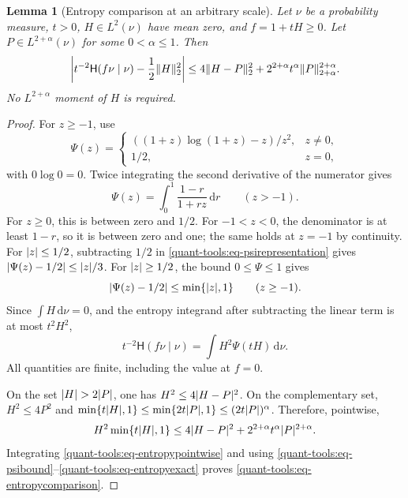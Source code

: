 \documentclass[11pt,reqno]{amsart}
\numberwithin{equation}{section}
\theoremstyle{plain}
\newtheorem{lemma}[lemma]{Lemma}
\theoremstyle{remark}
\DeclarePairedDelimiter{\abs}{\lvert}{\rvert}
\DeclarePairedDelimiter{\norm}{\lVert}{\rVert}
\newcommand{\md}{\mathrm{d}}
\newcommand{\Hr}{{\mathsf{H}}}
\begin{document}
\begin{lemma}[Entropy comparison at an arbitrary scale]\label{quant-tools:lem-entropy}
Let $\nu$ be a probability measure, $t>0$, $H\in L^2(\nu)$ have mean zero, and $f=1+tH\geq0$. Let $P\in L^{2+\alpha}(\nu)$ for some $0<\alpha\leq1$. Then
\begin{equation}\label{quant-tools:eq-entropycomparison}
 \left|t^{-2}\Hr(f\nu\mid\nu)-\frac12\norm H_2^2\right|
 \leq4\norm{H-P}_2^2+2^{2+\alpha}t^\alpha\norm P_{2+\alpha}^{2+\alpha}.
\end{equation}
No $L^{2+\alpha}$ moment of $H$ is required.
\end{lemma}
\begin{proof}
For $z\geq-1$, use
\begin{equation}\label{quant-tools:eq-psientropy}
 \Psi(z)=\begin{cases}((1+z)\log(1+z)-z)/z^2,&z\ne0,\\1/2,&z=0,\end{cases}
\end{equation}
with $0\log0=0$. Twice integrating the second derivative of the numerator gives
\begin{equation}\label{quant-tools:eq-psirepresentation}
 \Psi(z)=\int_0^1\frac{1-r}{1+rz}\,\md r\qquad(z>-1).
\end{equation}
For $z\geq0$, this is between zero and $1/2$. For $-1<z<0$, the denominator is at least $1-r$, so it is between zero and one; the same holds at $z=-1$ by continuity. For $\abs z\leq1/2$, subtracting $1/2$ in \eqref{quant-tools:eq-psirepresentation} gives
$\abs{\Psi(z)-1/2}\leq\abs z/3$. For $\abs z\geq1/2$, the bound $0\leq\Psi\leq1$ gives
\begin{equation}\label{quant-tools:eq-psibound}
 \abs{\Psi(z)-1/2}\leq\min\{\abs z,1\}\qquad(z\geq-1).
\end{equation}
Since $\int H\,\md\nu=0$, and the entropy integrand after subtracting the linear term is at most $t^2H^2$,
\begin{equation}\label{quant-tools:eq-entropyexact}
 t^{-2}\Hr(f\nu\mid\nu)=\int H^2\Psi(tH)\,\md\nu.
\end{equation}
All quantities are finite, including the value at $f=0$.

On the set $\abs H>2\abs P$, one has $H^2\leq4\abs{H-P}^2$. On the complementary set, $H^2\leq4P^2$ and
$\min\{t\abs H,1\}\leq\min\{2t\abs P,1\}\leq(2t\abs P)^\alpha$.
Therefore, pointwise,
\begin{equation}\label{quant-tools:eq-entropypointwise}
 H^2\min\{t\abs H,1\}
 \leq4\abs{H-P}^2+2^{2+\alpha}t^\alpha\abs P^{2+\alpha}.
\end{equation}
Integrating \eqref{quant-tools:eq-entropypointwise} and using \eqref{quant-tools:eq-psibound}--\eqref{quant-tools:eq-entropyexact} proves \eqref{quant-tools:eq-entropycomparison}.
\end{proof}
\end{document}
